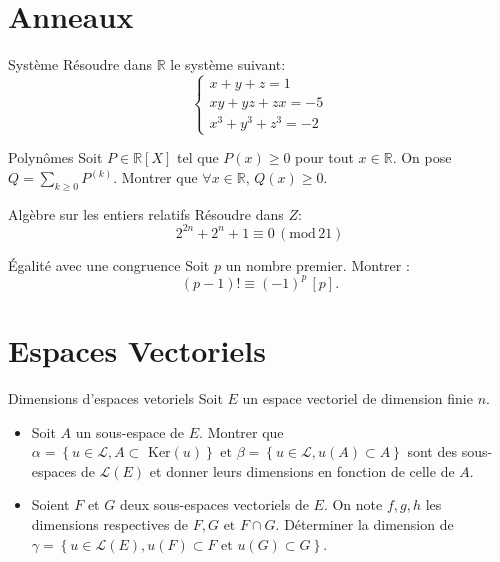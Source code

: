 \documentclass[french, a4paper, 11pt]{article}
\newcommand{\R}{\mathbb{R}}   %
\newcommand{\co}{\left[}         %
\newcommand{\cf}{\right]}        %
\newcommand{\cof}[1]{\co #1 \cf} %
\begin{document}
\section*{Anneaux}
\begin{cadre}{Système}
  Résoudre dans \(\R\) le système suivant:
  \[\begin{cases}
      x+y+z = 1\\
      xy + yz + zx = -5\\
      x^{3}+y^{3}+z^{3} = -2
  \end{cases}\]
\end{cadre}

\begin{cadre}{Polynômes}
  Soit \(P\in\R\cof{X}\) tel que \(P(x)\geqslant 0\) pour tout \(x\in\R\). On pose \(Q = \sum_{k\geqslant 0}P^{(k)}\).
  Montrer que \(\forall x \in\R,\,Q(x)\geqslant 0\).
\end{cadre}

\begin{cadre}{Algèbre sur les entiers relatifs}
  Résoudre dans \(Z\):
    \[2^{2n}+2^n+1 \equiv 0 \, (\mathrm{mod}{\, 21})\]
\end{cadre}

\begin{cadre}{Égalité avec une congruence}
  Soit \(p\) un nombre premier. Montrer :
    \[(p-1)! \equiv (-1)^p \, \cof{p}.\]
\end{cadre}

\section*{Espaces Vectoriels}

\begin{cadre}{Dimensions d'espaces vetoriels}
  Soit $E$ un espace vectoriel de dimension finie $n$.
  \begin{itemize}[label=$\bullet$]
    \item Soit $A$ un sous-espace de $E$. Montrer que \(\alpha=\left\{ u \in \mathcal{L}, A \subset \text{ Ker}(u)\right\}
  \text{ et } \beta=\left\{ u \in \mathcal{L}, u(A) \subset A\right\}\) sont des sous-espaces de $\mathcal{L}(E)$
  et donner leurs dimensions en fonction de celle de $A$.
    \item Soient $F$ et $G$ deux sous-espaces vectoriels de $E$. On note $f,g,h$ les dimensions respectives de \(F,G \text{ et } {F \cap G}\).
  Déterminer la dimension de \(\gamma=\left\{ u \in \mathcal{L}(E), u(F) \subset F \text{ et } u(G) \subset G\right\}\).
  \end{itemize}
\end{cadre}
\end{document}

